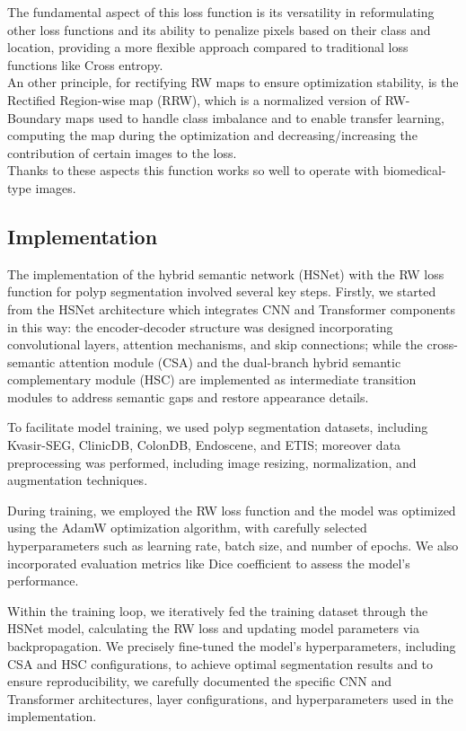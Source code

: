 \documentclass[
	a4paper, %
	10pt, %
	unnumberedsections, %
	twoside, %
]{LTJournalArticle}
\begin{document}
The fundamental aspect of this loss function is its versatility in reformulating other loss functions and its ability to penalize pixels based on their class and location, providing a more flexible approach compared to traditional loss functions like Cross entropy.
\\
An other principle, for rectifying RW maps to ensure optimization stability, is the Rectified Region-wise map (RRW), which is a normalized version of RW-Boundary maps used  to handle class imbalance and to enable transfer learning, computing the map during the optimization and decreasing/increasing the contribution of certain images to the loss.
\\
Thanks to these aspects this function works so well to operate with biomedical-type images.

\subsection{Implementation}

The implementation of the hybrid semantic network (HSNet) with the RW loss function for polyp segmentation involved several key steps. Firstly, we started from the HSNet architecture which integrates CNN and Transformer components in this way: the encoder-decoder structure was designed incorporating convolutional layers, attention mechanisms, and skip connections; while the cross-semantic attention module (CSA) and the dual-branch hybrid semantic complementary module (HSC) are implemented as intermediate transition modules to address semantic gaps and restore appearance details.

To facilitate model training, we used polyp segmentation datasets, including Kvasir-SEG, ClinicDB, ColonDB, Endoscene, and ETIS; moreover data preprocessing was performed, including image resizing, normalization, and augmentation techniques.

During training, we employed the RW loss function and the model was optimized using the AdamW optimization algorithm, with carefully selected hyperparameters such as learning rate, batch size, and number of epochs. We also incorporated evaluation metrics like Dice coefficient to assess the model's performance.

Within the training loop, we iteratively fed the training dataset through the HSNet model, calculating the RW loss and updating model parameters via backpropagation. We precisely fine-tuned the model's hyperparameters, including CSA and HSC configurations, to achieve optimal segmentation results and to ensure reproducibility, we carefully documented the specific CNN and Transformer architectures, layer configurations, and hyperparameters used in the implementation.
\end{document}

